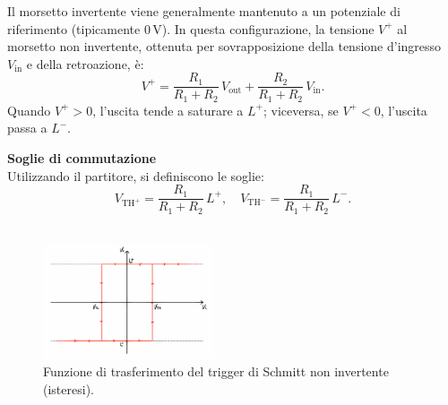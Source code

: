 Il morsetto invertente viene generalmente mantenuto a un potenziale di riferimento (tipicamente 0\,V). In questa configurazione, la tensione \(V^+\) al morsetto non invertente, ottenuta per sovrapposizione della tensione d’ingresso \(V_{\text{in}}\) e della retroazione, è:
\[
V^{+} = \frac{R_1}{R_1 + R_2}\, V_{\text{out}} + \frac{R_2}{R_1 + R_2}\, V_{\text{in}}.
\]
Quando \(V^{+} > 0\), l’uscita tende a saturare a \(L^+\); viceversa, se \(V^{+} < 0\), l’uscita passa a \(L^-\).

\vspace{2mm}
\textbf{Soglie di commutazione}\\[2mm]
Utilizzando il partitore, si definiscono le soglie:
\[
V_{\text{TH}^+} = \frac{R_1}{R_1 + R_2}\, L^+, \quad V_{\text{TH}^-} = \frac{R_1}{R_1 + R_2}\, L^-.
\]
\\[2mm]
\begin{figure}[H]
  \centering
  \includegraphics[width=0.45\textwidth]{images/1.6.4.2.png}
  \caption{Funzione di trasferimento del trigger di Schmitt non invertente (isteresi).}
  \label{fig:schmitt_non_invertente_tf}
\end{figure}

